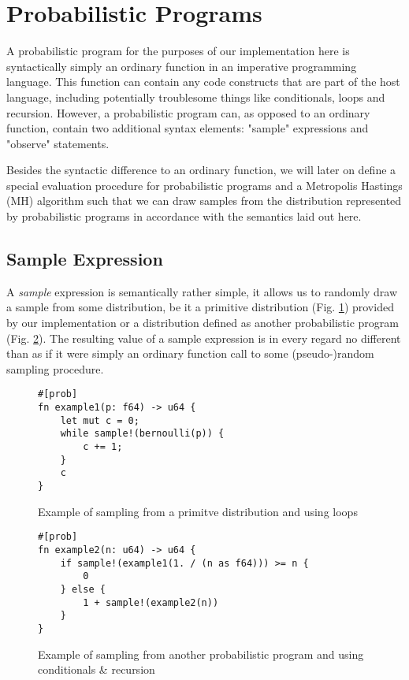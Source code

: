 \section{Probabilistic Programs}

A probabilistic program for the purposes of our implementation here is syntactically simply an ordinary function in an imperative programming language. This function can contain any code constructs that are part of the host language, including potentially troublesome things like conditionals, loops and recursion. However, a probabilistic program can, as opposed to an ordinary function, contain two additional syntax elements: "sample" expressions and "observe" statements.

Besides the syntactic difference to an ordinary function, we will later on define a special evaluation procedure for probabilistic programs and a Metropolis Hastings (MH) algorithm such that we can draw samples from the distribution represented by probabilistic programs in accordance with the semantics laid out here.

\subsection{Sample Expression}

A \textit{sample} expression is semantically rather simple, it allows us to randomly draw a sample from some distribution, be it a primitive distribution (Fig. \ref{example1}) provided by our implementation or a distribution defined as another probabilistic program (Fig. \ref{example2}). The resulting value of a sample expression is in every regard no different than as if it were simply an ordinary function call to some (pseudo-)random sampling procedure.

\begin{figure}[h]
\begin{lstlisting}
#[prob]
fn example1(p: f64) -> u64 {
    let mut c = 0;
    while sample!(bernoulli(p)) {
        c += 1;
    }
    c
}
\end{lstlisting}
\caption{Example of sampling from a primitve distribution and using loops}
\label{example1}
\end{figure}

\begin{figure}[h]
\begin{lstlisting}
#[prob]
fn example2(n: u64) -> u64 {
    if sample!(example1(1. / (n as f64))) >= n {
        0
    } else {
        1 + sample!(example2(n))
    }
}
\end{lstlisting}
\caption{Example of sampling from another probabilistic program and using conditionals \& recursion}
\label{example2}
\end{figure}


